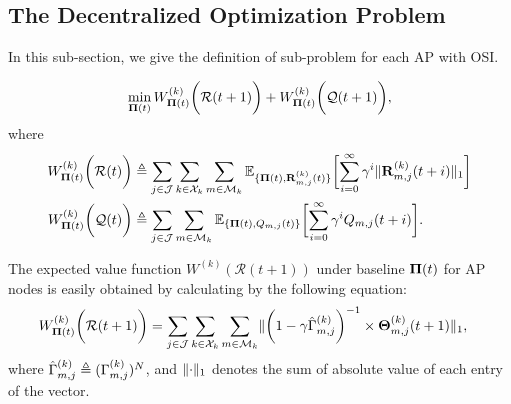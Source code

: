 \subsection{The Decentralized Optimization Problem}
In this sub-section, we give the definition of sub-problem for each AP with OSI.
\begin{problem}
    \begin{align}
        \min_{\boldsymbol{\Pi}(t)} W^{(k)}_{\boldsymbol{\Pi}(t)}\bigg(\mathcal{R}(t+1)\bigg) + W^{(k)}_{\boldsymbol{\Pi}(t)}\bigg(\mathcal{Q}(t+1)\bigg),
        \label{eqn:partial}
    \end{align}
    where 
    \begin{align}
        W^{(k)}_{\Baseline(t)}\Paren{\mathcal{R}(t)}
            &\define \sum_{j\in\jSpace}\sum_{k\in\ccSet_{k}}\sum_{m\in\esSet_{k}}
            \mathbb{E}_{\{\Baseline(t), \vec{R}^{(k)}_{m,j}(t)\}}\Bracket{
                \sum_{i=0}^{\infty} \gamma^{i} \Inorm{\vec{R}^{(k)}_{m,j}({t+i})}
            }
        \\
        W^{(k)}_{\Baseline(t)}\Paren{\mathcal{Q}(t)}
            &\define \sum_{j\in\jSpace}\sum_{m\in\esSet_{k}}
            \mathbb{E}_{\{\Baseline(t), Q_{m,j}(t)\}}\Bracket{
                \sum_{i=0}^{\infty} \gamma^{i} Q_{m,j}({t+i})
            }.
    \end{align}
\end{problem}

The expected value function $W^{(k)}(\mathcal{R}(t+1))$ under baseline $\boldsymbol{\Pi}(t)$ for AP nodes is easily obtained by calculating by the following equation:
\begin{align}
    &W^{(k)}_{\boldsymbol{\Pi}(t)}\bigg(\mathcal{R}(t+1)\bigg) = \sum_{j\in\mathcal{J}}\sum_{k\in\mathcal{X}_{k}}\sum_{m\in\mathcal{M}_{k}}
    \lVert
        \bigg(1 - \gamma \hat{\Gamma}^{(k)}_{m,j}\bigg)^{-1}
        \times \boldsymbol{\Theta}^{(k)}_{m,j}(t+1)
    \|_1,
    \label{w_ap}
\end{align}
where $\hat{\Gamma}^{(k)}_{m,j} \triangleq (\Gamma^{(k)}_{m,j})^{N}$, and $\lVert\cdot\|_1$ denotes the sum of absolute value of each entry of the vector.

